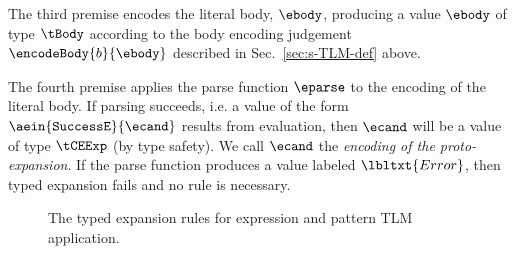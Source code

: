 \documentclass[acmsmall]{acmart}
\begin{document}
The third premise encodes the literal body, $\ebody$, producing a value $\ebody$ of type $\tBody$ according to the body encoding judgement $\encodeBody{b}{\ebody}$ described in Sec.~\ref{sec:s-TLM-def} above.

The fourth premise applies the parse function $\eparse$ to the encoding of the literal body. If parsing succeeds, i.e. a value of the form $\aein{\mathtt{SuccessE}}{\ecand}$ results from evaluation, then $\ecand$ will be a value of type $\tCEExp$ (by type safety). We call $\ecand$ the \emph{encoding of the proto-expansion}. If the parse function produces a value labeled $\lbltxt{Error}$, then typed expansion fails and no rule is necessary.



\begin{figure*}
{\small\begin{mathpar}
\end{mathpar}}
{\small\begin{mathpar}
\end{mathpar}}
\caption{The typed expansion rules for expression and pattern TLM application.}
\label{fig:ee-ap-setlm}
\end{figure*}
\end{document}
